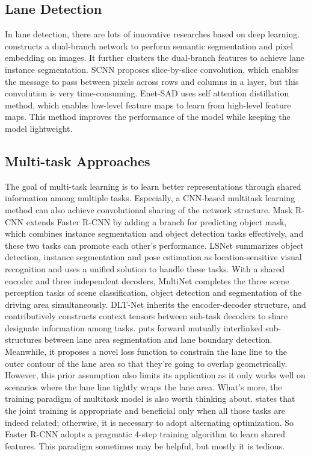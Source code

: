\documentclass[10pt,twocolumn,letterpaper]{article}
\begin{document}
\subsection{Lane Detection}
In lane detection, there are lots of innovative researches based on deep learning. \cite{lanenet} constructs a dual-branch network to perform semantic segmentation and pixel embedding on images. It further clusters the dual-branch features to achieve lane instance segmentation. SCNN \cite{scnn} proposes slice-by-slice convolution, which enables the message to pass between pixels across rows and columns in a layer, but this convolution is very time-consuming. Enet-SAD \cite{sad-enet} uses self attention distillation method, which enables low-level feature maps to learn from high-level feature maps. This method improves the performance of the model while keeping the model lightweight.

\subsection{Multi-task Approaches}
The goal of multi-task learning is to learn better representations through shared information among multiple tasks. Especially, a CNN-based multitask learning method can also achieve convolutional sharing of the network structure. Mask R-CNN \cite{mask-rcnn} extends Faster R-CNN by adding a branch for predicting object mask, which combines instance segmentation and object detection tasks effectively, and these two tasks can promote each other's performance. LSNet \cite{LSNet} summarizes object detection, instance segmentation and pose estimation as location-sensitive visual recognition and uses a unified solution to handle these tasks. With a shared encoder and three independent decoders, MultiNet \cite{multinet} completes the three scene perception tasks of scene classification, object detection and segmentation of the driving area simultaneously. DLT-Net \cite{dlt-net} inherits the encoder-decoder structure, and contributively constructs context tensors between sub-task decoders to share designate information among tasks. \cite{zhang2018geometric} puts forward mutually interlinked sub-structures between lane area segmentation and lane boundary detection. Meanwhile, it proposes a novel loss function to constrain the lane line to the outer contour of the lane area so that they're going to overlap geometrically. However, this prior assumption also limits its application as it only works well on scenarios where the lane line tightly wraps the lane area. What's more, the training paradigm of multitask model is also worth thinking about. \cite{kang2011learning} states that the joint training is appropriate and beneficial only when all those tasks are indeed related; otherwise, it is necessary to adopt alternating optimization. So Faster R-CNN \cite{faster-rcnn} adopts a pragmatic 4-step training algorithm to learn shared features. This paradigm sometimes may be helpful, but mostly it is tedious.
\end{document}
